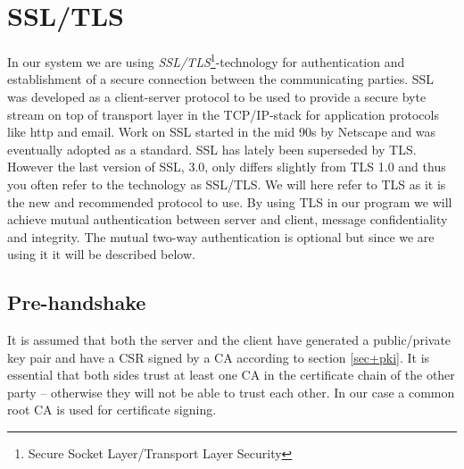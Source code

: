 \documentclass[10pt, a4paper]{article}
\begin{document}
\section{SSL/TLS}
\label{sec+tls}
In our system we are using \emph{SSL/TLS}\footnote{Secure Socket Layer/Transport Layer Security}-technology for authentication and establishment of a secure connection between the communicating parties. SSL was developed as a client-server protocol to be used to provide a secure byte stream on top of transport layer in the TCP/IP-stack for application protocols like http and email. Work on SSL started in the mid 90s by Netscape and was eventually adopted as a standard. SSL has lately been superseded by TLS. However the last version of SSL, 3.0, only differs slightly from TLS 1.0 and thus you often refer to the technology as SSL/TLS. We will here refer to TLS as it is the new  and recommended protocol to use. By using TLS in our program we will achieve mutual authentication between server and client, message confidentiality and integrity. The mutual two-way authentication is optional but since we are using it it will be described below.


\subsection{Pre-handshake}
It is assumed that both the server and the client have generated a public/private key pair and have a CSR signed by a CA according to section \ref{sec+pki}. It is essential that both sides trust at least one CA in the certificate chain of the other party -- otherwise they will not be able to trust each other. In our case a common root CA is used for certificate signing.
\end{document}
